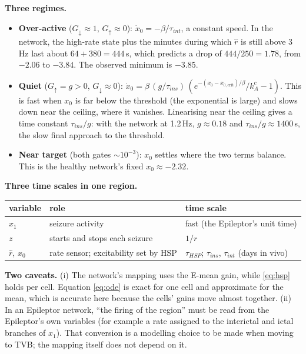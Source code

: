 \documentclass[11pt]{article}
\newcommand{\kA}{k_A}
\newcommand{\xc}{x_{0,\mathrm{crit}}}
\begin{document}
\textbf{Three regimes.}
\begin{itemize}
\item \textbf{Over-active} ($G_\downarrow\approx1$, $G_\uparrow\approx0$): $\dot x_0 = -\beta/\tau_{int}$, a constant speed.
In the network, the high-rate state plus the minutes during which $\hat r$ is still above 3\,Hz last about $64+380 =
444$\,s, which predicts a drop of $444/250 = 1.78$, from $-2.06$ to $-3.84$. The observed minimum is $-3.85$.
\item \textbf{Quiet} ($G_\uparrow = g>0$, $G_\downarrow\approx0$): $\dot x_0 = \beta\,(g/\tau_{ins})\,(e^{-(x_0-\xc)/\beta}/\kA^c - 1)$.
This is fast when $x_0$ is far below the threshold (the exponential is large) and slows down near the ceiling, where it
vanishes. Linearising near the ceiling gives a time constant $\tau_{ins}/g$: with the network at 1.2\,Hz, $g\approx0.18$
and $\tau_{ins}/g\approx1400$\,s, the slow final approach to the threshold.
\item \textbf{Near target} (both gates $\sim10^{-3}$): $x_0$ settles where the two terms balance. This is the healthy
network's fixed $x_0\approx-2.32$.
\end{itemize}

\textbf{Three time scales in one region.}
\begin{center}\small
\begin{tabular}{lll}
\toprule
variable & role & time scale \\
\midrule
$x_1$ & seizure activity & fast (the Epileptor's unit time) \\
$z$ & starts and stops each seizure & $1/r$ \\
$\hat r$, $x_0$ & rate sensor; excitability set by HSP & $\tau_{HSP}$; $\tau_{ins}$, $\tau_{int}$ (days in vivo) \\
\bottomrule
\end{tabular}
\end{center}

\textbf{Two caveats.} (i) The network's mapping uses the E-mean gain, while \eqref{eq:hsp} holds per cell. Equation
\eqref{eq:ode} is exact for one cell and approximate for the mean, which is accurate here because the cells' gains move
almost together. (ii) In an Epileptor network, ``the firing of the region'' must be read from the Epileptor's own
variables (for example a rate assigned to the interictal and ictal branches of $x_1$). That conversion is a modelling
choice to be made when moving to TVB; the mapping itself does not depend on it.
\end{document}
